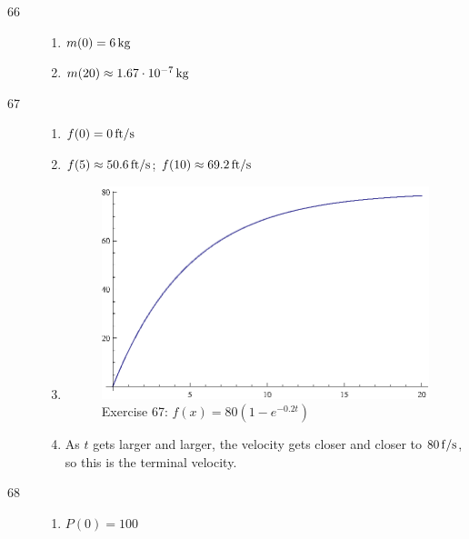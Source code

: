 \documentclass{exam}
\begin{document}
\begin{description}
      \item[66]
        \begin{enumerate}[a]
          \item $m(0) = \unit[6]{kg}$
          \item $m(20) \approx \unit[1.67 \cdot 10^{-7}]{kg}$
        \end{enumerate}

      \item[67]
        \begin{enumerate}[a]
          \item $f(0) = \unit[0]{ft/s}$

          \item $f(5) \approx \unit[50.6]{ft/s}$; $f(10) \approx \unit[69.2]{ft/s}$

          \item
            \begin{figure}[H]
              \centering
              \includegraphics[scale=0.9]{exercise67.eps}
              \caption*{Exercise 67: $f(x) = 80 \left( 1 - e^{-0.2t} \right)$}
            \end{figure}

          \item As $t$ gets larger and larger, the velocity gets closer and closer to $\unit[80]{f/s}$, so this is the
            terminal velocity.

        \end{enumerate}

      \item[68]
        \begin{enumerate}[a]
          \item $P(0) = 100$


\end{enumerate}
\end{description}
\end{document}
